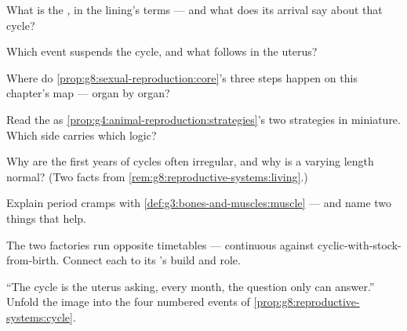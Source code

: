\begin{exercise}[$\star$]\label{exo:g8:reproductive-systems:5}
What is the , in the lining's terms ---
and what does its arrival say about that cycle?
\end{exercise}

\begin{exercise}[$\star$]\label{exo:g8:reproductive-systems:6}
Which event suspends the cycle, and what follows in the
uterus?
\end{exercise}

\begin{exercise}[$\star\star$]\label{exo:g8:reproductive-systems:7}
Where do \cref{prop:g8:sexual-reproduction:core}'s three
steps happen on this chapter's map --- organ by organ?
\end{exercise}

\begin{exercise}[$\star\star$]\label{exo:g8:reproductive-systems:8}
Read the  as
\cref{prop:g4:animal-reproduction:strategies}'s two
strategies in miniature. Which side carries which
logic?
\end{exercise}

\begin{exercise}[$\star\star$]\label{exo:g8:reproductive-systems:9}
Why are the first years of cycles often irregular, and
why is a varying length normal? (Two facts from
\cref{rem:g8:reproductive-systems:living}.)
\end{exercise}

\begin{exercise}[$\star\star$]\label{exo:g8:reproductive-systems:10}
Explain period cramps with
\cref{def:g3:bones-and-muscles:muscle} --- and name two
things that help.
\end{exercise}

\begin{exercise}[$\star\star$]\label{exo:g8:reproductive-systems:11}
The two factories run opposite timetables ---
continuous against cyclic-with-stock-from-birth. Connect
each to its 's build and role.
\end{exercise}

\begin{exercise}[$\star\star\star$]\label{exo:g8:reproductive-systems:12}
``The cycle is the uterus asking, every month, the
question only  can answer.'' Unfold the
image into the four numbered events of
\cref{prop:g8:reproductive-systems:cycle}.
\end{exercise}

